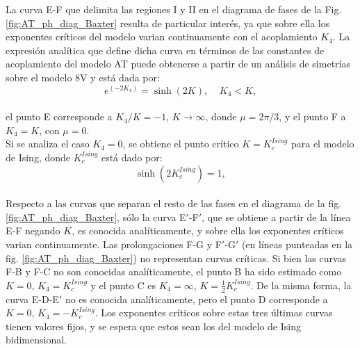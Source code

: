 La curva E-F que delimita las regiones I y II en el diagrama de fases de la Fig. \ref{fig:AT_ph_diag_Baxter} resulta de particular interés, ya que
 sobre ella los exponentes críticos del modelo varian continuamente con el acoplamiento $K_{4}$. La expresión analítica que define dicha curva
 en términos de las constantes de acoplamiento del modelo AT \cite{AT_fan1972a,baxter_book} puede obtenerse a partir de un análisis de simetrías sobre el modelo 8V
 y está dada por:
\\ 
\begin{equation}
	\label{eq:lincrit}
	e^{(-2K_{4})}=\sinh{(2K)} , \; \; \; \; K_{4}<K,
\end{equation}
\\
 el punto E corresponde a $K_{4}/K =-1$, $K\rightarrow\infty$, donde $\mu=2\pi/3$, y el punto F a $K_{4}=K$, con $\mu=0$.\\
Si se analiza el caso $K_{4}=0$, se obtiene el punto crítico $K=K_{c}^{Ising}$ para el modelo de Ising, donde $K_{c}^{Ising}$ está dado por:
\\
\begin{equation}
	\label{eq:isingcrit}
	\sinh{(2K_{c}^{Ising})}=1, %
\end{equation}
\\
Respecto a las curvas que separan el resto de las fases en el diagrama de la fig. \ref{fig:AT_ph_diag_Baxter}, sólo la curva E$'$-F$'$,
 que se obtiene a partir de la línea E-F negando $K$, es conocida analíticamente, y sobre ella los exponentes críticos varian continuamente.
 Las prolongaciones F-G y F$'$-G$'$ (en líneas punteadas en la fig. \ref{fig:AT_ph_diag_Baxter}) no representan
 curvas críticas. Si bien las curvas F-B y F-C no son conocidas analíticamente, el punto B ha sido estimado como $K=0$, $K_{4}=K_{c}^{Ising}$ y el punto C es
 $K_{4}=\infty$, $K=\frac{1}{2}K_{c}^{Ising}$. De la misma forma, la curva E-D-E$'$ no es conocida anal\'iticamente, pero el punto D corresponde a $K=0$, $K_{4}=-K_{c}^{Ising}$.
 Los exponentes críticos sobre estas tres últimas curvas tienen valores fijos, y se espera que estos sean los del modelo de Ising bidimensional.\\
